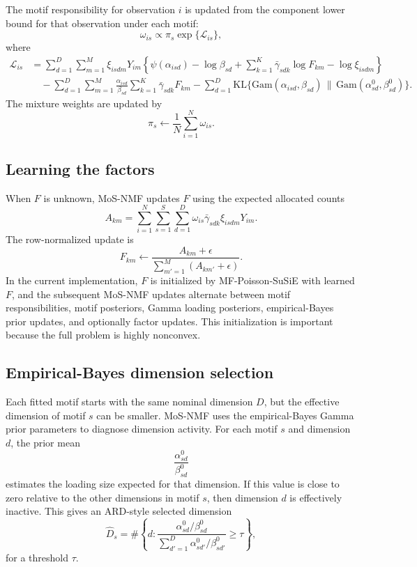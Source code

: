 \documentclass[11pt]{article}
\newcommand{\Gam}{\mathrm{Gam}}
\newcommand{\KL}{\mathrm{KL}}
\theoremstyle{definition}
\begin{document}
The motif responsibility for observation $i$ is updated from the component
lower bound for that observation under each motif:
\[
  \omega_{is}
  \propto
  \pi_s \exp\{\mathcal{L}_{is}\},
\]
where
\begin{align*}
  \mathcal{L}_{is}
  &=
  \sum_{d=1}^D\sum_{m=1}^M
  \xi_{isdm}Y_{im}
  \left\{
    \psi(\alpha_{isd})-\log\beta_{sd}
    +
    \sum_{k=1}^K \bar{\gamma}_{sdk}\log F_{km}
    -
    \log \xi_{isdm}
  \right\}
  \\
  &\quad
  -
  \sum_{d=1}^D\sum_{m=1}^M
  \frac{\alpha_{isd}}{\beta_{sd}}
  \sum_{k=1}^K \bar{\gamma}_{sdk}F_{km}
  -
  \sum_{d=1}^D
  \KL\{\Gam(\alpha_{isd},\beta_{sd})
  \,\|\,\Gam(\alpha_{sd}^0,\beta_{sd}^0)\}.
\end{align*}
The mixture weights are updated by
\[
  \pi_s \leftarrow \frac{1}{N}\sum_{i=1}^N \omega_{is}.
\]

\subsection{Learning the factors}

When $F$ is unknown, MoS-NMF updates $F$ using the expected allocated counts
\[
  A_{km}
  =
  \sum_{i=1}^N\sum_{s=1}^S\sum_{d=1}^D
  \omega_{is}\bar{\gamma}_{sdk}\xi_{isdm}Y_{im}.
\]
The row-normalized update is
\[
  F_{km}
  \leftarrow
  \frac{A_{km}+\epsilon}
       {\sum_{m'=1}^M(A_{km'}+\epsilon)}.
\]
In the current implementation, $F$ is initialized by MF-Poisson-SuSiE with
learned $F$, and the subsequent MoS-NMF updates alternate between motif
responsibilities, motif posteriors, Gamma loading posteriors, empirical-Bayes
prior updates, and optionally factor updates. This initialization is important
because the full problem is highly nonconvex.

\subsection{Empirical-Bayes dimension selection}

Each fitted motif starts with the same nominal dimension $D$, but the effective
dimension of motif $s$ can be smaller. MoS-NMF uses the empirical-Bayes Gamma
prior parameters to diagnose dimension activity. For each motif $s$ and
dimension $d$,
the prior mean
\[
  \frac{\alpha_{sd}^0}{\beta_{sd}^0}
\]
estimates the loading size expected for that dimension. If this value is close to
zero relative to the other dimensions in motif $s$, then dimension $d$ is effectively
inactive. This gives an ARD-style selected dimension
\[
  \widehat{D}_s
  =
  \#\left\{
    d:
    \frac{\alpha_{sd}^0/\beta_{sd}^0}
         {\sum_{d'=1}^D \alpha_{sd'}^0/\beta_{sd'}^0}
    \geq \tau
  \right\},
\]
for a threshold $\tau$.
\end{document}
